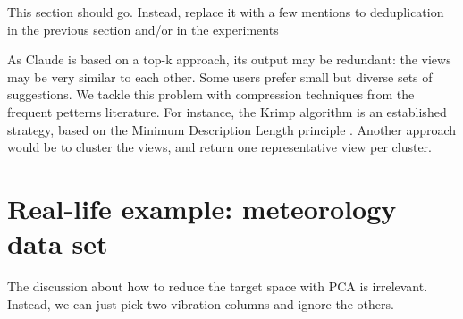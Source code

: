 { \color{red} This section should go. Instead, replace it with a few mentions
to deduplication in the previous section and/or in the experiments}

As Claude is based on a top-k approach, its output may be redundant: the views
may be very similar to each other.  Some users prefer small but diverse sets of
suggestions.  We tackle this problem with compression techniques from the
frequent petterns literature. For instance, the Krimp algorithm is an
established strategy, based on the Minimum Description Length principle
\cite{vreeken2011krimp}. Another approach would be to cluster the views, and
return one representative view per cluster.


\section{Real-life example: meteorology data set}

{\color{red}
    The discussion about how to reduce the target space with PCA is irrelevant.
    Instead, we can just pick two vibration columns and ignore the others.
}

